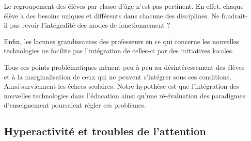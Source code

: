 Le regroupement des élèves par classe d'âge n'est pas pertinent. En effet, chaque élève a des besoins uniques et différents dans chacune des disciplines. Ne faudrait-il pas revoir l'intégralité des modes de fonctionnement ?

Enfin, les lacunes grandissantes des professeurs en ce qui concerne les nouvelles technologies ne facilite pas l'intégration de celles-ci par des initiatives locales.

Tous ces points problématiques mènent peu à peu au désintéressement des élèves et à la marginalisation de ceux qui ne peuvent s'intégrer sous ces conditions. Ainsi surviennent les échecs scolaires. Notre hypothèse est que l'intégration des nouvelles technologies dans l'éducation ainsi qu'une ré-évaluation des paradigmes d'enseignement pourraient régler ces problèmes.

\subsection{Hyperactivité et troubles de l'attention}

